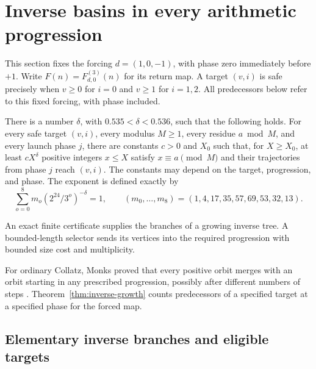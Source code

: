 \section{Inverse basins in every arithmetic progression}\label{sec:inverse}

This section fixes the forcing $d=(1,0,-1)$, with phase zero immediately
before $+1$. Write $F(n)=F_{d,0}^{(3)}(n)$ for its return map. A target
$(v,i)$ is safe precisely when $v\ge0$ for $i=0$ and $v\ge1$ for $i=1,2$.
All predecessors below refer to this fixed forcing, with phase included.

\begin{theorem}\label{thm:inverse-growth}
There is a number $\delta$, with $0.535<\delta<0.536$, such that the following
holds. For every safe target $(v,i)$, every modulus $M\ge1$, every residue
$a\bmod M$, and every launch phase $j$, there are constants $c>0$ and $X_0$
such that, for $X\ge X_0$, at least $cX^\delta$ positive integers $x\le X$
satisfy $x\equiv a\pmod M$ and their trajectories from phase $j$ reach
$(v,i)$. The constants may depend on the target, progression, and phase.
The exponent is defined exactly by
\begin{equation}\label{eq:inverse-exponent}
 \sum_{o=0}^{8}m_o(2^{24}/3^o)^{-\delta}=1,
 \qquad (m_0,\ldots,m_8)=(1,4,17,35,57,69,53,32,13).
\end{equation}
\end{theorem}

An exact finite certificate supplies the branches of a growing inverse
tree. A bounded-length selector sends its vertices into the required
progression with bounded size cost and multiplicity.

For ordinary Collatz, Monks proved that every positive orbit merges
with an orbit starting in any prescribed progression, possibly after
different numbers of steps \cite[Theorem~1.1]{monks-2006}.
Theorem~\ref{thm:inverse-growth} counts predecessors of a specified
target at a specified phase for the forced map.

\subsection{Elementary inverse branches and eligible targets}

